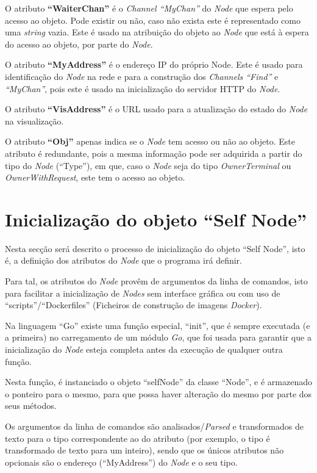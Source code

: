 O atributo \textbf{``WaiterChan''} é o \emph{Channel ``MyChan''} do \emph{Node} que espera pelo acesso ao objeto. Pode existir ou não, caso não exista este é representado como uma \emph{string} vazia.
Este é usado na atribuição do objeto ao \emph{Node} que está à espera do acesso ao objeto, por parte do \emph{Node}.

O atributo \textbf{``MyAddress''} é o endereço \acs{IP} do próprio Node. 
Este é usado para identificação do \emph{Node} na rede e para a construção dos \emph{Channels ``Find''} e \emph{``MyChan''},
pois este é usado na inicialização do servidor \acs{HTTP} do \emph{Node}.

O atributo \textbf{``VisAddress''} é o \acs{URL} usado para a atualização do estado do \emph{Node} na visualização.

O atributo \textbf{``Obj''} apenas indica se o \emph{Node} tem acesso ou não ao objeto.
Este atributo é redundante, pois a mesma informação pode ser adquirida a partir do tipo do \emph{Node} (``Type''), 
em que, caso o \emph{Node} seja do tipo \emph{OwnerTerminal} ou \emph{OwnerWithRequest}, este tem o acesso ao objeto.


\section{Inicialização do objeto ``Self Node''}
\label{implementacao:sec:inicializacao}

Nesta secção será descrito o processo de inicialização do objeto ``Self Node'', 
isto é, a definição dos atributos do \emph{Node} que o programa irá definir.

Para tal, os atributos do \emph{Node} provêm de argumentos da linha de comandos, isto para facilitar
a inicialização de \emph{Nodes} sem interface gráfica ou com uso de ``scripts''/``Dockerfiles'' (Ficheiros de construção de imagens \emph{Docker}).

Na linguagem ``Go'' existe uma função especial, ``init'', que é sempre executada (e a primeira) no carregamento de um módulo \emph{Go},
que foi usada para garantir que a inicialização do \emph{Node} esteja completa antes da execução de qualquer outra função.



Nesta função, é instanciado o objeto ``selfNode'' da classe ``Node'', e é armazenado o ponteiro para o mesmo, para que possa haver alteração do mesmo
por parte dos seus métodos.

Os argumentos da linha de comandos são analisados/\emph{Parsed} e transformados de texto para o tipo
correspondente ao do atributo (por exemplo, o tipo é transformado de texto para um inteiro), sendo que 
os únicos atributos não opcionais são o endereço (``MyAddress'') do \emph{Node} e o seu tipo.


